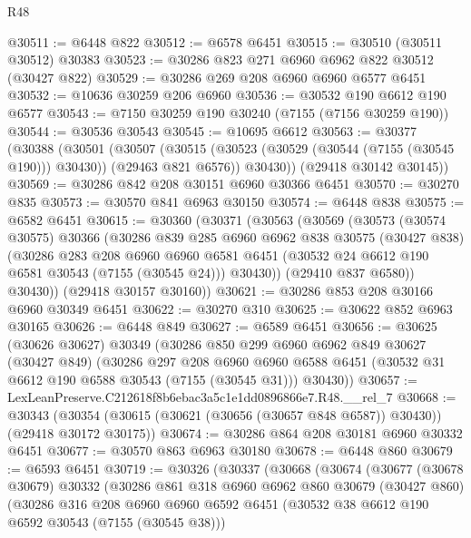 \begin{lexlean}{R48}
\begin{coremodule}
@30511 := @6448 @822
@30512 := @6578 @6451
@30515 := @30510 (@30511 @30512) @30383
@30523 := @30286 @823 @271 @6960 @6962 @822 @30512 (@30427 @822)
@30529 := @30286 @269 @208 @6960 @6960 @6577 @6451
@30532 := @10636 @30259 @206 @6960
@30536 := @30532 @190 @6612 @190 @6577
@30543 := @7150 @30259 @190 @30240 (@7155 (@7156 @30259 @190))
@30544 := @30536 @30543
@30545 := @10695 @6612
@30563 := @30377
    (@30388
      (@30501
        (@30507
          (@30515 (@30523 (@30529 (@30544 (@7155 (@30545 @190))) @30430)) (@29463 @821 @6576))
          @30430))
      (@29418 @30142 @30145))
@30569 := @30286 @842 @208 @30151 @6960 @30366 @6451
@30570 := @30270 @835
@30573 := @30570 @841 @6963 @30150
@30574 := @6448 @838
@30575 := @6582 @6451
@30615 := @30360
    (@30371
      (@30563
        (@30569
          (@30573
            (@30574 @30575)
            @30366
            (@30286
              @839
              @285
              @6960
              @6962
              @838
              @30575
              (@30427 @838)
              (@30286
                @283
                @208
                @6960
                @6960
                @6581
                @6451
                (@30532 @24 @6612 @190 @6581 @30543 (@7155 (@30545 @24)))
                @30430))
            (@29410 @837 @6580))
          @30430))
      (@29418 @30157 @30160))
@30621 := @30286 @853 @208 @30166 @6960 @30349 @6451
@30622 := @30270 @310
@30625 := @30622 @852 @6963 @30165
@30626 := @6448 @849
@30627 := @6589 @6451
@30656 := @30625
    (@30626 @30627)
    @30349
    (@30286
      @850
      @299
      @6960
      @6962
      @849
      @30627
      (@30427 @849)
      (@30286
        @297
        @208
        @6960
        @6960
        @6588
        @6451
        (@30532 @31 @6612 @190 @6588 @30543 (@7155 (@30545 @31)))
        @30430))
@30657 := LexLeanPreserve.C212618f8b6ebac3a5c1e1dd0896866e7.R48.__rel_7
@30668 := @30343
    (@30354 (@30615 (@30621 (@30656 (@30657 @848 @6587)) @30430)) (@29418 @30172 @30175))
@30674 := @30286 @864 @208 @30181 @6960 @30332 @6451
@30677 := @30570 @863 @6963 @30180
@30678 := @6448 @860
@30679 := @6593 @6451
@30719 := @30326
    (@30337
      (@30668
        (@30674
          (@30677
            (@30678 @30679)
            @30332
            (@30286
              @861
              @318
              @6960
              @6962
              @860
              @30679
              (@30427 @860)
              (@30286
                @316
                @208
                @6960
                @6960
                @6592
                @6451
                (@30532 @38 @6612 @190 @6592 @30543 (@7155 (@30545 @38)))

\end{coremodule}
\end{lexlean}
